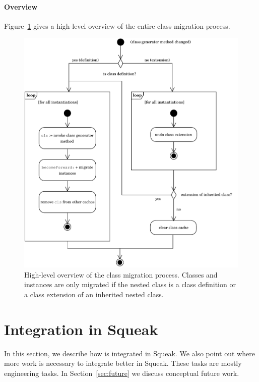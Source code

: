 \paragraph{Overview}
Figure~\ref{fig:impl_update_cycle} gives a high-level overview of the entire class migration process.

\begin{figure}[!htp]
	\centering
	\includegraphics[width=\textwidth]{update_cycle.pdf}
	\caption[Class migration process]{High-level overview of the class migration process. Classes and instances are only migrated if the nested class is a class definition or a class extension of an inherited nested class.}
	\label{fig:impl_update_cycle}
\end{figure}

\section{Integration in Squeak}
In this section, we describe how \msname is integrated in Squeak. We also point out where more work is necessary to integrate \msname better in Squeak. These tasks are mostly engineering tasks. In Section~\ref{sec:future} we discuss conceptual future work.

